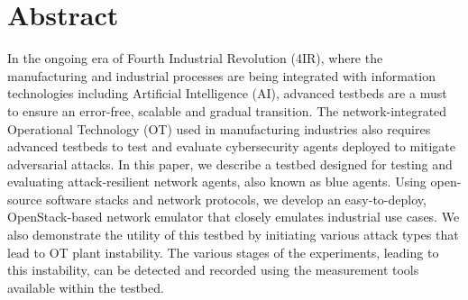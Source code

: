 \section*{Abstract}
In the ongoing era of Fourth Industrial Revolution (4IR), where the manufacturing and industrial processes are being integrated with information technologies including Artificial Intelligence (AI), advanced testbeds are a must to ensure an error-free, scalable and gradual transition. The network-integrated Operational Technology (OT) used in manufacturing industries also requires advanced testbeds to test and evaluate cybersecurity agents deployed to mitigate adversarial attacks.
In this paper, we describe a testbed designed for testing and evaluating attack-resilient network agents, also known as blue agents. Using open-source software stacks and network protocols, we develop an easy-to-deploy, OpenStack-based network emulator that closely emulates industrial use cases. We also demonstrate the utility of this testbed by initiating various attack types that lead to OT plant instability. The various stages of the experiments, leading to this instability, can be detected and recorded using the measurement tools available within the testbed.
